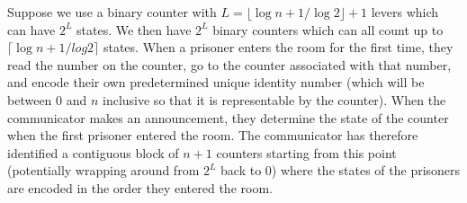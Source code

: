 \begin{parts}
\begin{solution}
		Suppose we use a binary counter with $L = \lfloor \log{n + 1} / \log{2} \rfloor + 1$ levers which can have $2^L$ states. We then have $2^L$ binary counters which can all count up to $\lceil \log{n + 1} / log{2}\rceil$ states. When a prisoner enters the room for the first time, they read the number on the counter, go to the counter associated with that number, and encode their own predetermined unique identity number (which will be between 0 and $n$ inclusive so that it is representable by the counter). When the communicator makes an announcement, they determine the state of the counter when the first prisoner entered the room. The communicator has therefore identified a contiguous block of $n + 1$ counters starting from this point (potentially wrapping around from $2^L$ back to 0) where the states of the prisoners are encoded in the order they entered the room.
		
	\end{solution}
	
	\fi

\end{parts}
